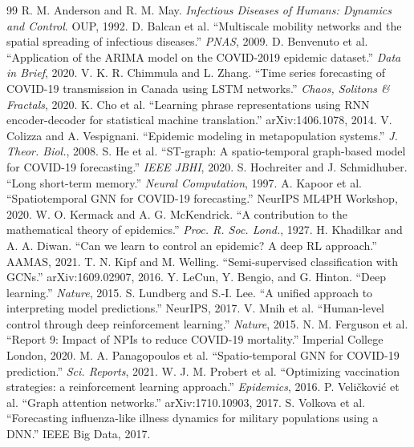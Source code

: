 \documentclass[10pt, a4paper, twocolumn]{article}
\begin{document}

\begin{thebibliography}{99}
 R. M. Anderson and R. M. May. \textit{Infectious Diseases of Humans: Dynamics and Control}. OUP, 1992.
 D. Balcan et al. ``Multiscale mobility networks and the spatial spreading of infectious diseases.'' \textit{PNAS}, 2009.
 D. Benvenuto et al. ``Application of the ARIMA model on the COVID-2019 epidemic dataset.'' \textit{Data in Brief}, 2020.
 V. K. R. Chimmula and L. Zhang. ``Time series forecasting of COVID-19 transmission in Canada using LSTM networks.'' \textit{Chaos, Solitons \& Fractals}, 2020.
 K. Cho et al. ``Learning phrase representations using RNN encoder-decoder for statistical machine translation.'' arXiv:1406.1078, 2014.
 V. Colizza and A. Vespignani. ``Epidemic modeling in metapopulation systems.'' \textit{J. Theor. Biol.}, 2008.
 S. He et al. ``ST-graph: A spatio-temporal graph-based model for COVID-19 forecasting.'' \textit{IEEE JBHI}, 2020.
 S. Hochreiter and J. Schmidhuber. ``Long short-term memory.'' \textit{Neural Computation}, 1997.
 A. Kapoor et al. ``Spatiotemporal GNN for COVID-19 forecasting.'' NeurIPS ML4PH Workshop, 2020.
 W. O. Kermack and A. G. McKendrick. ``A contribution to the mathematical theory of epidemics.'' \textit{Proc. R. Soc. Lond.}, 1927.
 H. Khadilkar and A. A. Diwan. ``Can we learn to control an epidemic? A deep RL approach.'' AAMAS, 2021.
 T. N. Kipf and M. Welling. ``Semi-supervised classification with GCNs.'' arXiv:1609.02907, 2016.
 Y. LeCun, Y. Bengio, and G. Hinton. ``Deep learning.'' \textit{Nature}, 2015.
 S. Lundberg and S.-I. Lee. ``A unified approach to interpreting model predictions.'' NeurIPS, 2017.
 V. Mnih et al. ``Human-level control through deep reinforcement learning.'' \textit{Nature}, 2015.
 N. M. Ferguson et al. ``Report 9: Impact of NPIs to reduce COVID-19 mortality.'' Imperial College London, 2020.
 M. A. Panagopoulos et al. ``Spatio-temporal GNN for COVID-19 prediction.'' \textit{Sci. Reports}, 2021.
 W. J. M. Probert et al. ``Optimizing vaccination strategies: a reinforcement learning approach.'' \textit{Epidemics}, 2016.
 P. Veličković et al. ``Graph attention networks.'' arXiv:1710.10903, 2017.
 S. Volkova et al. ``Forecasting influenza-like illness dynamics for military populations using a DNN.'' IEEE Big Data, 2017.
\end{thebibliography}
\end{document}
